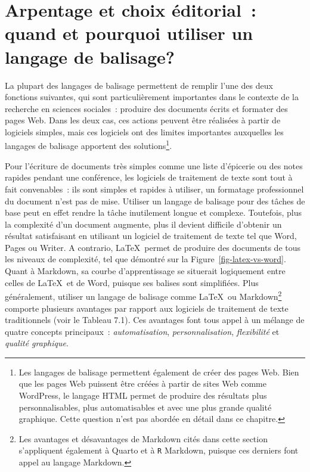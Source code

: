 \documentclass[
  letterpaper,
  DIV=11,
  numbers=noendperiod]{scrreprt}
\begin{document}
\hypertarget{arpentage-et-choix-uxe9ditorial-quand-et-pourquoi-utiliser-un-langage-de-balisage}{%
\section{Arpentage et choix éditorial~: quand et pourquoi utiliser un
langage de
balisage?}\label{arpentage-et-choix-uxe9ditorial-quand-et-pourquoi-utiliser-un-langage-de-balisage}}

La plupart des langages de balisage permettent de remplir l'une des deux
fonctions suivantes, qui sont particulièrement importantes dans le
contexte de la recherche en sciences sociales~: produire des documents
écrits et formater des pages Web. Dans les deux cas, ces actions peuvent
être réalisées à partir de logiciels simples, mais ces logiciels ont des
limites importantes auxquelles les langages de balisage apportent des
solutions\footnote{Les langages de balisage permettent également de
  créer des pages Web. Bien que les pages Web puissent être créées à
  partir de sites Web comme WordPress, le langage HTML permet de
  produire des résultats plus personnalisables, plus automatisables et
  avec une plus grande qualité graphique. Cette question n'est pas
  abordée en détail dans ce chapitre.}.

Pour l'écriture de documents très simples comme une liste d'épicerie ou
des notes rapides pendant une conférence, les logiciels de traitement de
texte sont tout à fait convenables~: ils sont simples et rapides à
utiliser, un formatage professionnel du document n'est pas de mise.
Utiliser un langage de balisage pour des tâches de base peut en effet
rendre la tâche inutilement longue et complexe. Toutefois, plus la
complexité d'un document augmente, plus il devient difficile d'obtenir
un résultat satisfaisant en utilisant un logiciel de traitement de texte
tel que Word, Pages ou Writer. A contrario, \LaTeX~permet de produire
des documents de tous les niveaux de complexité, tel que démontré sur la
Figure~\ref{fig-latex-vs-word}. Quant à Markdown, sa courbe
d'apprentissage se situerait logiquement entre celles de \LaTeX~et de
Word, puisque ses balises sont simplifiées. Plus généralement, utiliser
un langage de balisage comme \LaTeX~ou Markdown\footnote{Les avantages
  et désavantages de Markdown cités dans cette section s'appliquent
  également à Quarto et à \texttt{R} Markdown, puisque ces derniers font
  appel au langage Markdown.} comporte plusieurs avantages par rapport
aux logiciels de traitement de texte traditionnels (voir le Tableau
7.1). Ces avantages font tous appel à un mélange de quatre concepts
principaux~: \emph{automatisation}, \emph{personnalisation},
\emph{flexibilité} et \emph{qualité graphique}.
\end{document}
